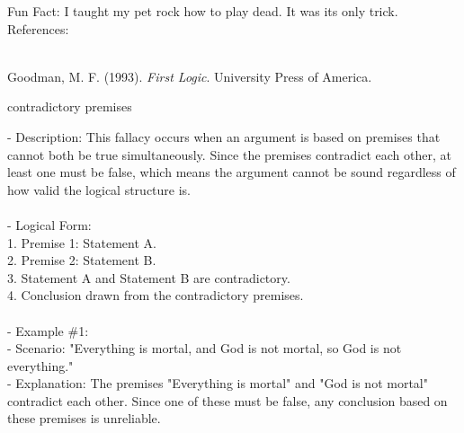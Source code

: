 \documentclass[a4paper,12pt,single,pdftex]{scrbook}
\begin{document}
      
        Fun Fact: I taught my pet rock how to play dead. It was its only trick.
      \\

    
    References:

    
      
        
      \\

      
        
          Goodman, M. F. (1993). {\it First Logic}. University Press of America.
        
      
    
  

contradictory premises
    
      
        - Description: This fallacy occurs when an argument is based on premises that cannot both be true simultaneously. Since the premises contradict each other, at least one must be false, which means the argument cannot be sound regardless of how valid the logical structure is.
      \\

      
        
      \\

      
        - Logical Form:
      \\

      
          1. Premise 1: Statement A.
      \\

      
          2. Premise 2: Statement B.
      \\

      
          3. Statement A and Statement B are contradictory.
      \\

      
          4. Conclusion drawn from the contradictory premises.
      \\

      
        
      \\

      
        - Example \#1:
      \\

      
          - Scenario: "Everything is mortal, and God is not mortal, so God is not everything."
      \\

      
          - Explanation: The premises "Everything is mortal" and "God is not mortal" contradict each other. Since one of these must be false, any conclusion based on these premises is unreliable.
      \\
\end{document}
